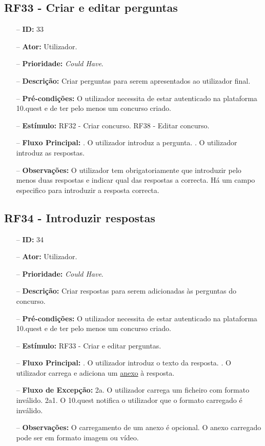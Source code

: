 \subsection{RF33 - Criar e editar perguntas}
\begin{itemize}
	\item[--] \textbf{ID:} 33
	\item[--]  \textbf{Ator:} Utilizador.
	\item[--]  \textbf{Prioridade:} \textit{Could Have}.
	\item[--]  \textbf{Descrição:} Criar perguntas para serem apresentados ao utilizador final.
	\item[--]  \textbf{Pré-condições:} O utilizador necessita de estar autenticado na plataforma 10.quest e de ter pelo menos um concurso criado.
	\item[--]  \textbf{Estímulo:}  
	\subitem RF32 - Criar concurso.
	\subitem RF38 - Editar concurso.
	\item[--]  \textbf{Fluxo Principal:} 
	. O utilizador introduz a pergunta.
	. O utilizador introduz as respostas.
	\item[--]  \textbf{Observações:} O utilizador tem obrigatoriamente que introduzir pelo menos duas respostas e indicar qual das respostas a correcta. Há um campo especifico para introduzir a resposta correcta.
\end{itemize}
\newpage

\subsection{RF34 - Introduzir respostas}
\begin{itemize}
	\item[--] \textbf{ID:} 34
	\item[--]  \textbf{Ator:} Utilizador.
	\item[--]  \textbf{Prioridade:} \textit{Could Have}.
	\item[--]  \textbf{Descrição:} Criar respostas para serem adicionadas às perguntas do concurso.
	\item[--]  \textbf{Pré-condições:} O utilizador necessita de estar autenticado na plataforma 10.quest e de ter pelo menos um concurso criado.
	\item[--]  \textbf{Estímulo:} RF33 - Criar e editar perguntas.
	\item[--]  \textbf{Fluxo Principal:} 
	. O utilizador introduz o texto da resposta.
	. O utilizador carrega e adiciona um \underline{anexo} à resposta.
	\item[--]  \textbf{Fluxo de Excepção:} 
	\subitem 2a. O utilizador carrega um ficheiro com formato inválido.
	\subitem 2a1. O 10.quest notifica o utilizador que o formato carregado é inválido.
	\item[--]  \textbf{Observações:} O carregamento de um anexo é opcional. O anexo carregado pode ser em formato imagem ou vídeo.
\end{itemize}
\newpage

